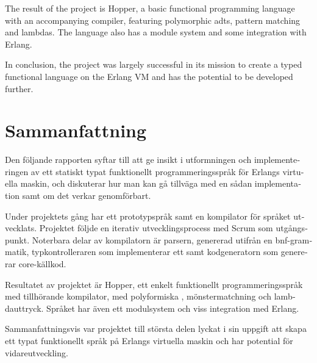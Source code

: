 
The result of the project is Hopper, a basic functional programming language with an accompanying compiler, featuring polymorphic \glspl{adt}, pattern matching and lambdas. The language also has a module system and some integration with Erlang. 

In conclusion, the project was largely successful in its mission to create a typed functional language on the Erlang VM and has the potential to be developed further.

\section*{Sammanfattning}

\begin{otherlanguage}{swedish}
Den följande rapporten syftar till att ge insikt i utformningen och implementeringen av ett statiskt typat funktionellt programmeringsspråk för Erlangs virtuella maskin, och diskuterar hur man kan gå tillväga med en sådan implementation samt om det verkar genomförbart.

Under projektets gång har ett prototypspråk samt en kompilator för språket utvecklats. Projektet följde en iterativ utvecklingsprocess med Scrum som utgångspunkt. Noterbara delar av kompilatorn är parsern, genererad utifrån en \acrshort{bnf}-grammatik, typkontrolleraren som implementerar ett  samt kodgeneratorn som genererar \gls{core}-källkod.

Resultatet av projektet är Hopper, ett enkelt funktionellt programmeringsspråk med tillhörande kompilator, med polyformiska , mönstermatchning och lambdauttryck. Språket har även ett modulsystem och viss integration med Erlang.

Sammanfattningsvis var projektet till största delen lyckat i sin uppgift att skapa ett typat funktionellt språk på Erlangs virtuella maskin och har potential för vidareutveckling.
\end{otherlanguage}


\newpage				%
\thispagestyle{empty}
\mbox{}